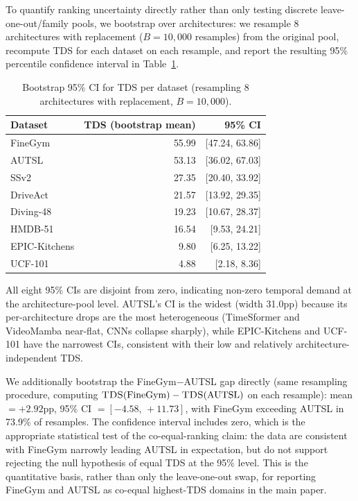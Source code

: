 \documentclass[a4paper, 10pt, conference, onecolumn]{ieeeconf}
\newcommand{\tabtight}{\setlength{\tabcolsep}{3.5pt}\renewcommand{\arraystretch}{1.12}}
\newcommand{\TDS}{\textsc{TDS}}
\begin{document}
To quantify ranking uncertainty directly rather than only testing discrete leave-one-out/family pools, we bootstrap over architectures: we resample 8 architectures with replacement ($B{=}10{,}000$ resamples) from the original pool, recompute \TDS{} for each dataset on each resample, and report the resulting 95\% percentile confidence interval in Table~\ref{tab:bootstrap_ci}.

\begin{table}[!htbp]
\centering
\caption{Bootstrap 95\% CI for \TDS{} per dataset (resampling 8 architectures with replacement, $B{=}10{,}000$).}
\label{tab:bootstrap_ci}
\scriptsize\tabtight
\begin{tabular}{l r r}
\toprule
Dataset & \TDS{} (bootstrap mean) & 95\% CI \\
\midrule
FineGym       & 55.99 & [47.24, 63.86] \\
AUTSL         & 53.13 & [36.02, 67.03] \\
SSv2          & 27.35 & [20.40, 33.92] \\
DriveAct      & 21.57 & [13.92, 29.35] \\
Diving-48     & 19.23 & [10.67, 28.37] \\
HMDB-51       & 16.54 & [9.53, 24.21] \\
EPIC-Kitchens &  9.80 & [6.25, 13.22] \\
UCF-101       &  4.88 & [2.18, 8.36] \\
\bottomrule
\end{tabular}
\end{table}

All eight 95\% CIs are disjoint from zero, indicating non-zero temporal demand at the architecture-pool level. AUTSL's CI is the widest (width 31.0pp) because its per-architecture drops are the most heterogeneous (TimeSformer and VideoMamba near-flat, CNNs collapse sharply), while EPIC-Kitchens and UCF-101 have the narrowest CIs, consistent with their low and relatively architecture-independent \TDS{}.

We additionally bootstrap the FineGym$-$AUTSL gap directly (same resampling procedure, computing $\TDS(\text{FineGym})-\TDS(\text{AUTSL})$ on each resample): mean $=+2.92$pp, 95\% CI $=[-4.58,\,+11.73]$, with FineGym exceeding AUTSL in 73.9\% of resamples. The confidence interval includes zero, which is the appropriate statistical test of the co-equal-ranking claim: the data are consistent with FineGym narrowly leading AUTSL in expectation, but do not support rejecting the null hypothesis of equal \TDS{} at the 95\% level. This is the quantitative basis, rather than only the leave-one-out swap, for reporting FineGym and AUTSL as co-equal highest-\TDS{} domains in the main paper.
\end{document}
